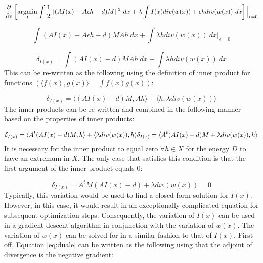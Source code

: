 \begin{equation}
\frac{\partial{}}{\partial{}\epsilon{}}\left[\argmin_I  \int{}\frac{1}{2}||(AI(x)+A\epsilon{}h - d)M||^{2} \ dx + \lambda{}\int{}I(x)div(w(x))+\epsilon{}hdiv(w(x)) \ dx\right]\Big|_{\epsilon=0}
\end{equation}

\begin{equation}
\int{}(AI(x)+A\epsilon{}h - d)MAh \ dx + \int{}\lambda{}hdiv(w(x)) \ dx\Big|_{\epsilon=0}
\end{equation}

\begin{equation}
\delta_{I(x)} = \int{}(AI(x) - d)MAh \ dx + \int{}\lambda{}hdiv(w(x)) \ dx
\end{equation}
This can be re-written as the following using the definition of inner product for functions $\left(\langle{}f(x),g(x)\rangle{} = \int{}f(x)g(x)\right)$:

\begin{equation}
\delta_{I(x)} = \langle{}(AI(x) - d)M,Ah\rangle{} + \langle{}h,\lambda{}div(w(x))\rangle{} 
\end{equation}
The inner products can be re-written and combined in the following manner based on the properties of inner products:

\begin{equation}
\delta_{I(x)} = \langle{}A^t(AI(x) - d)M,h\rangle{} + \langle{}\lambda{}div(w(x)),h\rangle{} \\
\delta_{I(x)} = \langle{}A^t(AI(x) - d)M + \lambda{}div(w(x)),h\rangle{}\label{eq:tvinnerI}
\end{equation}
It is necessary for the inner product to equal zero $\forall h\in{}X$ for the energy $D$ to have an extremum in $X$.  The only case that satisfies this condition is that the first argument of the inner product equals 0: 

\begin{equation}
\delta_{I(x)}  = A^tM\left(AI(x)-d\right) + \lambda{}div(w(x)) = 0\label{eq:tvdeltaI}
\end{equation}
Typically, this variation would be used to find a closed form solution for $I(x)$. However, in this case, it would result in an exceptionally complicated equation for subsequent optimization steps. Consequently, the variation of $I(x)$ can be used in a gradient descent algorithm in conjunction with the variation of $w(x)$. The variation of $w(x)$ can be solved for in a similar fashion to that of $I(x)$.  First off, Equation \ref{eq:duale} can be written as the following using that the adjoint of divergence is the negative gradient:

